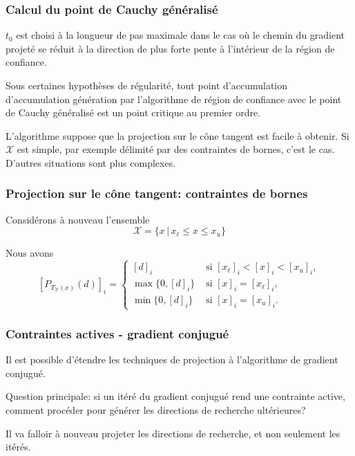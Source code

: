 \documentclass[t,usepdftitle=false]{beamer}
\def\cX{\mathcal{X}}
\begin{document}
\begin{frame}
\frametitle{Calcul du point de Cauchy généralisé}

$t_0$ est choisi à la longueur de pas maximale dans le cas où le chemin du gradient projeté se réduit à la direction de plus forte pente à l'intérieur de la région de confiance.

\mbox{}

Sous certaines hypothèses de régularité, tout point d'accumulation d'accumulation génération par l'algorithme de région de confiance avec le point de Cauchy généralisé est un point critique au premier ordre.

\mbox{}

L'algorithme suppose que la projection sur le cône tangent est facile à obtenir.
Si $\cX$ est simple, par exemple délimité par des contraintes de bornes, c'est le cas. D'autres situations sont plus complexes.

\end{frame}

\begin{frame}
\frametitle{Projection sur le cône tangent: contraintes de bornes}

Considérons à nouveau l'ensemble
$$
\cX = \lbrace x \,|\, x_{\ell} \leq x \leq x_u \rbrace
$$

\mbox{}

Nous avons
$$
[P_{T_{\cX}(x)}(d)]_i =
\begin{cases}
[d]_i & \mbox{ si } [x_{\ell}]_i < [x]_i < [x_u]_i, \\
\max\{0, [d]_i\} & \mbox{ si } [x]_i = [x_{\ell}]_i, \\
\min\{0, [d]_i\} & \mbox{ si } [x]_i = [x_u]_i.
\end{cases}
$$

\end{frame}

\begin{frame}
	\frametitle{Contraintes actives - gradient conjugué}
	
	Il est possible d'étendre les techniques de projection à l'algorithme de gradient conjugué.
	
	\mbox{}
	
	Question principale: si un itéré du gradient conjugué rend une contrainte active, comment procéder pour générer les directions de recherche ultérieures?
	
	\mbox{}
	
	Il va falloir à nouveau projeter les directions de recherche, et non seulement les itérés.
	
\end{frame}
\end{document}
